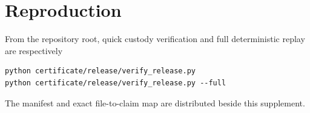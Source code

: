 \documentclass[11pt]{article}
\begin{document}
\section{Reproduction}

From the repository root, quick custody verification and full deterministic
replay are respectively
\begin{verbatim}
python certificate/release/verify_release.py
python certificate/release/verify_release.py --full
\end{verbatim}
The manifest and exact file-to-claim map are distributed beside this
supplement.
\end{document}
